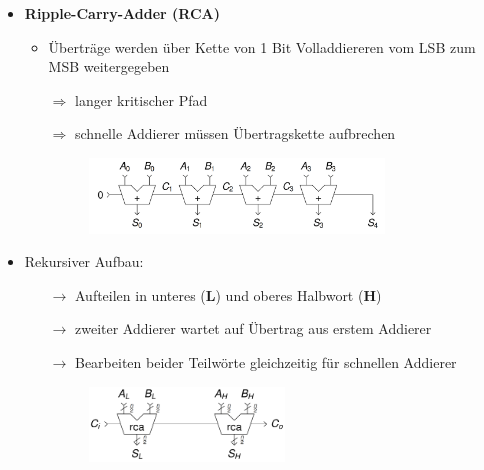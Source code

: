 \documentclass[11pt,a4paper]{article}
\begin{document}
\begin{itemize}
\item \textbf{Ripple-Carry-Adder (RCA)}
	\begin{itemize}
	\item Überträge werden über Kette von 1 Bit Volladdiereren vom LSB zum MSB weitergegeben
	\item[$\Rightarrow$] langer kritischer Pfad
	\item[$\Rightarrow$] schnelle Addierer müssen Übertragskette aufbrechen
	\item[]
		\begin{figure}[H]
			\begin{center}
			\includegraphics[height=2cm]{rca}
			\end{center}
		\end{figure}
	\end{itemize}

	\item Rekursiver Aufbau:
		\begin{itemize}
		\item[$\rightarrow$] Aufteilen in unteres (\textbf{L}) und oberes Halbwort (\textbf{H})
		\item[$\rightarrow$] zweiter Addierer wartet auf Übertrag aus erstem Addierer
		\item[$\rightarrow$] Bearbeiten beider Teilwörte gleichzeitig für schnellen Addierer
		\item[]
			\begin{figure}[H]
				\begin{center}
				\includegraphics[height=2cm]{rca2}
				\end{center}
			\end{figure}
		\end{itemize}
		
\pagebreak		
		

\end{itemize}
\end{document}
